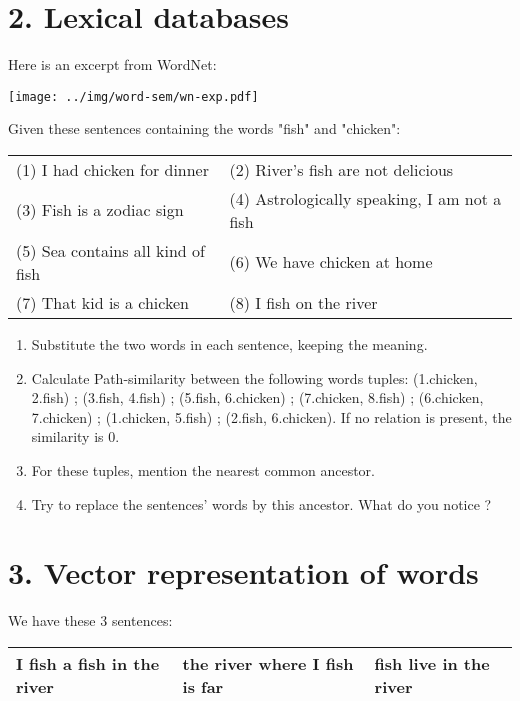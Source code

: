 \documentclass[11pt, a4paper]{article}
\begin{document}
\section*{2. Lexical databases}

Here is an excerpt from WordNet:

\noindent
\texttt{[image: ../img/word-sem/wn-exp.pdf]}

\noindent
Given these sentences containing the words "fish" and "chicken":

\begin{center}
	\begin{tabular}{|ll|}
	\hline 
	(1) I had chicken for dinner & (2) River's fish are not delicious \\
	(3) Fish is a zodiac sign & (4) Astrologically speaking, I am not a fish \\
	(5) Sea contains all kind of fish & (6) We have chicken at home \\
	(7) That kid is a chicken & (8) I fish on the river\\
	\hline
\end{tabular}
\end{center}

\begin{enumerate}
	\item Substitute the two words in each sentence, keeping the meaning.
	
	\item Calculate Path-similarity between the following words tuples: (1.chicken, 2.fish) ; (3.fish, 4.fish) ; (5.fish, 6.chicken) ; (7.chicken, 8.fish) ; (6.chicken, 7.chicken) ; (1.chicken, 5.fish) ; (2.fish, 6.chicken). If no relation is present, the similarity is 0.
	\item For these tuples, mention the nearest common ancestor.
	\item Try to replace the sentences' words by this ancestor. What do you notice ?
\end{enumerate}


\section*{3. Vector representation of words}

We have these 3 sentences: 

\begin{center}
	\begin{tabular}{|lll|}
	\hline 
	I fish a fish in the river & the river where I fish is far & fish live in the river\\
	\hline
\end{tabular}
\end{center}
\end{document}
